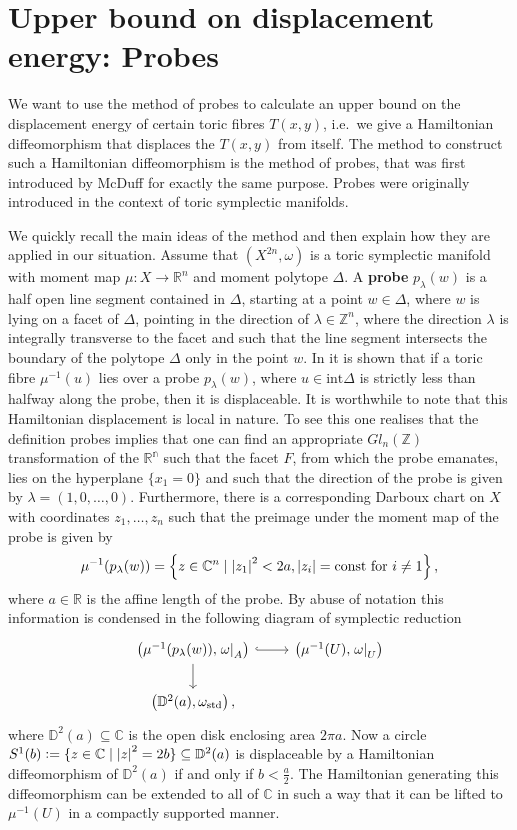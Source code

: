 \documentclass[12pt,a4paper,draft]{scrartcl}
\begin{document}
\section{Upper bound on displacement energy: Probes}

We want to use the method of probes to calculate an upper bound on the displacement energy of certain toric fibres $T(x,y)$, i.e.\ we give a Hamiltonian diffeomorphism that displaces the $T(x,y)$ from itself.
The method to construct such a Hamiltonian diffeomorphism is the method of probes, that was first introduced by McDuff \cite{mcduff2011displacing} for exactly the same purpose.
Probes were originally introduced in the context of toric symplectic manifolds.

We quickly recall the main ideas of the method and then explain how they are applied in our situation.
Assume that $(X^{2n},\omega)$ is a toric symplectic manifold with moment map $μ \colon X → ℝ^n$ and moment polytope $\Delta$.
A \textbf{probe} $p_\lambda(w)$ is a half open line segment contained in $\Delta$, starting at a point $w \in \Delta$, where $w$ is lying on a facet of $\Delta$, pointing in the direction of $\lambda \in ℤ^n$, where the direction  $\lambda$ is integrally transverse to the facet and such that the line segment intersects the boundary of the polytope $\Delta$ only in the point $w$.
In \cite[Lemma 2.4.]{mcduff2011displacing} it is shown that if a toric fibre $\mu^{-1}(u)$ lies over a probe $p_\lambda(w)$, where $u\in \text{int}\Delta$ is strictly less than halfway along the probe, then it is displaceable.
It is worthwhile to note that this Hamiltonian displacement is local in nature.
To see this one realises that the definition probes implies that one can find an appropriate $Gl_n(\mathbb{Z})$ transformation of the $\mathbb{R^n}$ such that the facet $F$, from which the probe emanates, lies on the hyperplane $\{x_1=0\}$ and such that the direction of the probe is given by $\lambda=(1,0,\ldots,0)$.
Furthermore, there is a corresponding Darboux chart on $X$ with coordinates $z_1,\ldots,z_n$ such that the preimage under the moment map of the probe is given by
\begin{equation*}
  \mu^{-1}(p_\lambda(w))=\left\{z\in \mathbb{C}^n \mid \abs{z_1}^2<2a, \abs{z_i}=\text{const for }i\neq 1\right\},
\end{equation*}
where $a \in \mathbb{R}$ is the affine length of the probe.
By abuse of notation this information is condensed in the following diagram of symplectic reduction
\[
\begin{tikzcd}
  \left(\mu^{-1}(p_\lambda(w)),\left.\omega\right|_A\right)\ar[r,hook]\ar[d]&
  \left(\mu^{-1}(U),\left.\omega\right|_U\right)
  \\
  \left(\mathbb{D}^2(a),\omega_\text{std}\right),
\end{tikzcd}
\]
where $\mathbb{D}^2(a)\subseteq \mathbb{C}$ is the open disk enclosing area $2\pi a$.
Now a circle $S^1(b)\vcentcolon=\{z\in \mathbb{C}\mid \abs{z}^2=2b\} \subseteq \mathbb{D}^2(a)$ is displaceable by a Hamiltonian diffeomorphism of $\mathbb{D}^2(a)$ if and only if $b<\frac{a}{2}$.
The Hamiltonian generating this diffeomorphism can be extended to all of $\mathbb{C}$ in such a way that it can be lifted to $\mu^{-1}(U)$ in a compactly supported manner.
\end{document}
